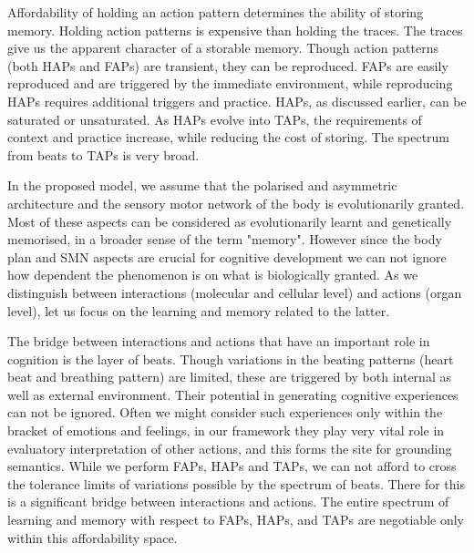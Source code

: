{{{{{Affordability of holding an action pattern determines the ability of storing memory. Holding action patterns is expensive than holding the traces. The traces give us the apparent character of a storable memory. Though action patterns (both HAPs and FAPs) are transient, they can be reproduced. FAPs are easily reproduced and are triggered by the immediate environment, while reproducing HAPs requires additional triggers and practice. HAPs, as discussed earlier, can be saturated or unsaturated. As HAPs evolve into TAPs, the requirements of context and practice increase, while reducing the cost of storing. The spectrum from beats to TAPs is very broad. 

In the proposed model, we assume that the polarised and asymmetric architecture and the sensory motor network of the body is evolutionarily granted. Most of these aspects can be considered as evolutionarily learnt and genetically memorised, in a broader sense of the term "memory". However since the body plan and SMN aspects are crucial for cognitive development we can not ignore how dependent the phenomenon is on what is biologically granted. As we distinguish between interactions (molecular and cellular level) and actions (organ level), let us focus on the learning and memory related to the latter. 

The bridge between interactions and actions that have an important role in cognition is the layer of beats. Though variations in the beating patterns (heart beat and breathing pattern) are limited, these are triggered by both internal as well as external environment. Their potential in generating cognitive experiences can not be ignored. Often we might consider such experiences only within the bracket of emotions and feelings, in our framework they play very vital role in evaluatory interpretation of other actions, and this forms the site for grounding semantics. While we perform FAPs, HAPs and TAPs, we can not afford to cross the tolerance limits of variations possible by the spectrum of beats. There for this is a significant bridge between interactions and actions. The entire spectrum of learning and memory with respect to FAPs, HAPs, and TAPs are negotiable only within this affordability space. 

}}}}}
